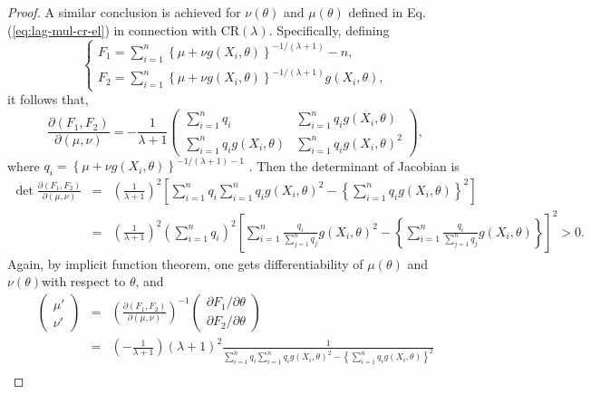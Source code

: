\documentclass[oneside,english]{amsbook}
\numberwithin{section}{chapter}
\numberwithin{equation}{section}
\numberwithin{figure}{section}
\theoremstyle{plain}
\theoremstyle{plain}
\theoremstyle{definition}
\theoremstyle{plain}
\theoremstyle{plain}
\theoremstyle{remark}
\theoremstyle{definition}
\theoremstyle{definition}
\begin{document}
\begin{proof}
A similar conclusion is achieved for $\nu\left(\theta\right)$ and
$\mu\left(\theta\right)$ defined in Eq. (\ref{eq:lag-mul-cr-el}) in
connection with CR$\left(\lambda\right)$. Specifically, defining
\[
\begin{cases}
F_{1}=\sum_{i=1}^{n}\left\{ \mu+\nu g\left(X_{i},\theta\right)\right\} ^{-1/(\lambda+1)}-n,\\
F_{2}=\sum_{i=1}^{n}\left\{ \mu+\nu g\left(X_{i},\theta\right)\right\} ^{-1/(\lambda+1)}g\left(X_{i},\theta\right),
\end{cases}
\]
it follows that,
\[
\frac{\partial\left(F_{1},F_{2}\right)}{\partial\left(\mu,\nu\right)}=-\frac{1}{\lambda+1}\left(\begin{array}{cc}
\sum_{i=1}^{n}q_{i} & \sum_{i=1}^{n}q_{i} g\left(X_{i},\theta\right)\\
\sum_{i=1}^{n}q_{i} g\left(X_{i},\theta\right) & \sum_{i=1}^{n}q_{i} g\left(X_{i},\theta\right)^{2}
\end{array}\right),
\]
 where $q_{i}=\left\{ \mu+\nu g\left(X_{i},\theta\right)\right\} ^{-1/(\lambda+1)-1}$
. Then the determinant of Jacobian is 
\begin{eqnarray*}
\det\frac{\partial\left(F_{1},F_{2}\right)}{\partial\left(\mu,\nu\right)} & = & \left(\frac{1}{\lambda+1}\right)^{2}\left[\sum_{i=1}^{n}q_{i}\sum_{i=1}^{n}q_{i}g\left(X_{i},\theta\right)^{2}-\left\{ \sum_{i=1}^{n}q_{i}g\left(X_{i},\theta\right)\right\} ^{2}\right]\\
 & = & \left(\frac{1}{\lambda+1}\right)^{2}\left(\sum_{i=1}^{n}q_{i}\right)^{2}\left[\sum_{i=1}^{n}\frac{q_{i}}{\sum_{j=1}^{n}q_{j}}g\left(X_{i},\theta\right)^{2}-\left\{ \sum_{i=1}^{n}\frac{q_{i}}{\sum_{j=1}^{n}q_{j}}g\left(X_{i},\theta\right)\right\} \right]^{2}>0.
\end{eqnarray*}
Again, by implicit function theorem, one gets differentiability of
$\mu\left(\theta\right)$ and $\nu\left(\theta\right)$with respect
to $\theta$, and 
\begin{eqnarray}
\left(\begin{array}{c}
\mu'\\
\nu'
\end{array}\right) & = & \left(\frac{\partial\left(F_{1},F_{2}\right)}{\partial\left(\mu,\nu\right)}\right)^{-1}\left(\begin{array}{c}
\partial F_{1}/\partial\theta\\
\partial F_{2}/\partial\theta
\end{array}\right)\nonumber \\
 & = & \left(-\frac{1}{\lambda+1}\right)\left(\lambda+1\right)^{2}\frac{1}{\sum_{i=1}^{n}q_{i}\sum_{i=1}^{n}q_{i}g\left(X_{i},\theta\right)^{2}-\left\{ \sum_{i=1}^{n}q_{i}g\left(X_{i},\theta\right)\right\} ^{2}}\nonumber \\

\end{eqnarray}
\end{proof}
\end{document}
